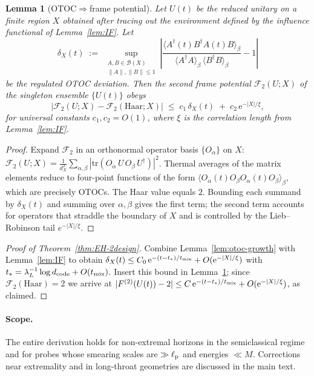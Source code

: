 \documentclass[a4paper,11pt]{article}
\theoremstyle{plain}
\newtheorem{lemma}{Lemma}
\theoremstyle{definition}
\theoremstyle{remark}
\begin{document}
\begin{lemma}[OTOC$\Rightarrow$frame potential]
\label{lem:otoc-to-fp}
Let $U(t)$ be the reduced unitary on a finite region $X$ obtained after tracing out the environment defined by the influence functional of Lemma~\ref{lem:IF}.
Let
\[
\delta_X(t)\;:=\;\sup_{\substack{A,B\in\mathcal{B}(X)\\ \|A\|,\|B\|\le 1}}\left|\frac{\langle A^\dagger(t)B^\dagger A(t)B\rangle_\beta}{\langle A^\dagger A\rangle_\beta\,\langle B^\dagger B\rangle_\beta}-1\right|
\]
be the regulated OTOC deviation.
Then the second frame potential $\mathcal{F}_2(U;X)$ of the singleton ensemble $\{U(t)\}$ obeys
\[
\big|\mathcal{F}_2(U;X)-\mathcal{F}_2(\mathrm{Haar};X)\big|\;\le\; c_1\,\delta_X(t)\;+\;c_2\,\mathrm{e}^{-|X|/\xi},
\]
for universal constants $c_1,c_2=O(1)$, where $\xi$ is the correlation length from Lemma~\ref{lem:IF}.
\end{lemma}
\begin{proof}
Expand $\mathcal{F}_2$ in an orthonormal operator basis $\{O_\alpha\}$ on $X$:
$\mathcal{F}_2(U;X)=\frac{1}{d_X^2}\sum_{\alpha,\beta} |\mathrm{tr}(O_\alpha\,U\,O_\beta\,U^\dagger)|^2$.
Thermal averages of the matrix elements reduce to four-point functions of the form $\langle O_\alpha(t)O_\beta O_\alpha(t)O_\beta\rangle_\beta$, which are precisely OTOCs.
The Haar value equals $2$.
Bounding each summand by $\delta_X(t)$ and summing over $\alpha,\beta$ gives the first term; the second term accounts for operators that straddle the boundary of $X$ and is controlled by the Lieb--Robinson tail $e^{-|X|/\xi}$.
\end{proof}

\begin{proof}[Proof of Theorem~\ref{thm:EH-2design}]
Combine Lemma~\ref{lem:otoc-growth} with Lemma~\ref{lem:IF} to obtain
$\delta_X(t)\le C_0\,\mathrm{e}^{-(t-t_\ast)/t_{\rm mix}}+O(\mathrm{e}^{-|X|/\xi})$ with $t_\ast=\lambda_L^{-1}\log d_{\rm code}+O(t_{\rm mix})$.
Insert this bound in Lemma~\ref{lem:otoc-to-fp}; since $\mathcal{F}_2(\mathrm{Haar})=2$ we arrive at
$|F^{(2)}(U(t))-2|\le C\,\mathrm{e}^{-(t-t_\ast)/t_{\rm mix}}+O(\mathrm{e}^{-|X|/\xi})$, as claimed.
\end{proof}

\paragraph{Scope.}
The entire derivation holds for non-extremal horizons in the semiclassical regime and for probes whose smearing scales are $\gg\ell_{\rm p}$ and energies $\ll M$.
Corrections near extremality and in long-throat geometries are discussed in the main text.
\end{document}

